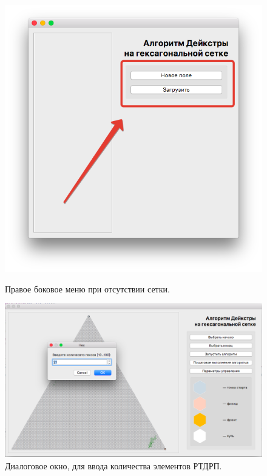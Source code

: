 \begin{figure}[h]
\begin{center}
\begin{minipage}[h]{0.47\linewidth}
\includegraphics[width=1\linewidth]{inc/img/menuWitCreate}
\caption{Правое боковое меню при отсутствии сетки.} %
\label{axis:cube} %
\end{minipage}
\hfill 
\begin{minipage}[h]{0.47\linewidth}
\includegraphics[width=1\linewidth]{inc/img/numOfElems}
\caption{Диалоговое окно, для ввода количества элементов РТДРП.}
\label{axis:axial}
\end{minipage}
\end{center}
\end{figure}

